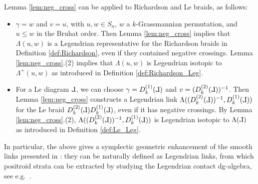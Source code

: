 \documentclass[10pt]{amsart}
\theoremstyle{plain}
\theoremstyle{definition}
\theoremstyle{remark}
\numberwithin{equation}{section}
\newcommand{\La}{\Lambda}
\def\Le{\reflectbox{$\mathrm{L}$}}
\begin{document}

\noindent Lemma \ref{lem:neg_cross} can be applied to Richardson and Le braids, as follows:
\begin{itemize}
    \item[(a)] $\gamma=w$ and $v=u$, with $u,w\in S_n$, $w$ a $k$-Grassmannian permutation, and $u
    \leq w$ in the Bruhat order. Then Lemma \ref{lem:neg_cross} implies that $\La(u,w)$ is a Legendrian representative for the Richardson braids in Definition \ref{def:Richardson}, even if they contained negative crossings. Lemma \ref{lem:neg_cross}.(2) implies that $\La(u,w)$ is Legendrian isotopic to $\La^+(u,w)$ as introduced in Definition \ref{def:Richardson_Leg}.\\

    \item[(b)] For a Le diagram $\Le$, we can choose $\gamma=D_k^{(1)}(\Le)$ and $v=(D_k^{(2)}(\Le))^{-1}$. Then Lemma \ref{lem:neg_cross} constructs a Legendrian link $\La((D_k^{(2)}(\Le))^{-1},D_k^{(1)}(\Le))$ for the Le braid $D_k^{(2)}(\Le)D_k^{(1)}(\Le)$, even if it has negative crossings. By Lemma \ref{lem:neg_cross}.(2), $\La((D_k^{(2)}(\Le))^{-1},D_k^{(1)}(\Le))$ is Legendrian isotopic to $\La(\Le)$ as introduced in Definition \ref{def:Le_Leg}.
\end{itemize}

\noindent In particular, the above gives a symplectic geometric enhancement of the smooth links presented in \cite[Section 3]{GL}: they can be naturally defined as Legendrian links, from which positroid strata can be extracted by studying the Legendrian contact dg-algebra, see e.g.~\cite{CGGS,CasalsNg,CasalsWeng22}.


%
\end{document}
